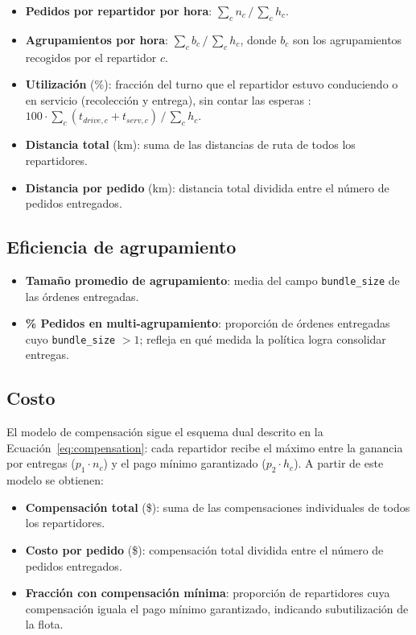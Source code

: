 \documentclass[12pt,letterpaper,oneside]{book}
\begin{document}
	\begin{itemize}
		\item \textbf{Pedidos por repartidor por hora}:
		      $\sum_c n_c\,/\,\sum_c h_c$.
		\item \textbf{Agrupamientos por hora}:
		      $\sum_c b_c\,/\,\sum_c h_c$, donde $b_c$ son los agrupamientos
		      recogidos por el repartidor $c$.
		\item \textbf{Utilización} (\%): fracción del turno que el repartidor estuvo
		      conduciendo o en servicio (recolección y entrega), sin contar las esperas
		      \citep{Reyes2018}: $100 \cdot \sum_c (t_{drive,c} + t_{serv,c})\,/\,\sum_c h_c$.
		\item \textbf{Distancia total} (km): suma de las distancias de ruta de
		      todos los repartidores.
		\item \textbf{Distancia por pedido} (km): distancia total dividida entre
		      el número de pedidos entregados.
	\end{itemize}

	\subsection{Eficiencia de agrupamiento}

	\begin{itemize}
		\item \textbf{Tamaño promedio de agrupamiento}: media del campo
		      \texttt{bundle\_size} de las órdenes entregadas.
		\item \textbf{\% Pedidos en multi-agrupamiento}: proporción de órdenes
		      entregadas cuyo \texttt{bundle\_size} $> 1$; refleja en qué medida
		      la política logra consolidar entregas.
	\end{itemize}

	\subsection{Costo}

	El modelo de compensación sigue el esquema dual descrito en la
	Ecuación~\ref{eq:compensation}: cada repartidor recibe el máximo entre la
	ganancia por entregas ($p_1 \cdot n_c$) y el pago mínimo garantizado
	($p_2 \cdot h_c$).  A partir de este modelo se obtienen:

	\begin{itemize}
		\item \textbf{Compensación total} (\$): suma de las compensaciones
		      individuales de todos los repartidores.
		\item \textbf{Costo por pedido} (\$): compensación total dividida entre
		      el número de pedidos entregados.
		\item \textbf{Fracción con compensación mínima}: proporción de repartidores
		      cuya compensación iguala el pago mínimo garantizado, indicando
		      subutilización de la flota.
	\end{itemize}
\end{document}
